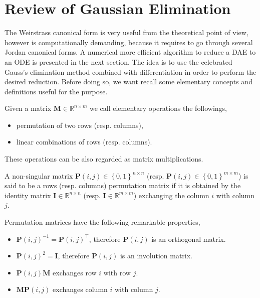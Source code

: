 	\section{Review of Gaussian Elimination}
		The Weirstrass canonical form is very useful from the theoretical point of view, however is computationally demanding, because it requires to go through several Jordan canonical forms. A numerical more efficient algorithm to reduce a DAE to an ODE is presented in the next section. The idea is to use the celebrated Gauss's elimination method combined with differentiation in order to perform the desired reduction. Before doing so, we want recall some elementary concepts and definitions useful for the purpose. 
		\begin{definition}
			Given a matrix $\bm{M}\in\mathbb{R}^{n\times m}$ we call elementary operations the followings,
			\begin{itemize}
				\item permutation of two rows (resp. columns),
				\item linear combinations of rows (resp. columns). 
			\end{itemize} 
		\end{definition}
		These operations can be also regarded as matrix multiplications.
		\begin{definition}
			A non-singular matrix $\bm{P}(i,j)\in\left\lbrace0,1\right\rbrace^{n\times n}$ (resp. $\bm{P}(i,j)\in\left\lbrace0,1\right\rbrace^{m\times m}$) is said to be a rows (resp. columns) permutation matrix if it is obtained by the identity matrix $\bm{I}\in\mathbb{R}^{n\times n}$ (resp. $\bm{I}\in\mathbb{R}^{m\times m}$) exchanging the column $i$ with column $j$.
		\end{definition}
		Permutation matrices have the following remarkable properties,
		\begin{itemize}
			\item $\bm{P}(i,j)^{-1} = \bm{P}(i,j)^{\intercal}$, therefore $\bm{P}(i,j)$ is an orthogonal matrix.
			\item $\bm{P}(i,j)^{2}=\bm{I}$, therefore $\bm{P}(i,j)$ is an involution matrix.
			\item $\bm{P}(i,j)\bm{M}$ exchanges row $i$ with row $j$. 
			\item $\bm{MP}(i,j)$ exchanges column $i$ with column $j$.
		\end{itemize}
